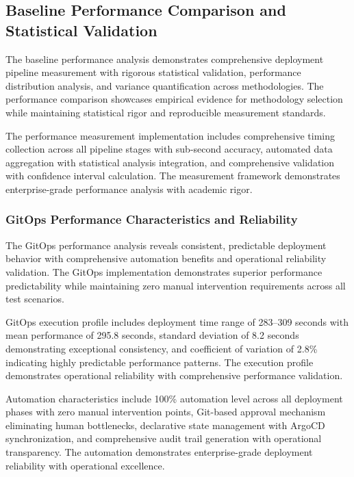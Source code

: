 \subsection{Baseline Performance Comparison and Statistical Validation}
\label{subsec:baseline_performance}

The baseline performance analysis demonstrates comprehensive deployment pipeline measurement with rigorous statistical validation, performance distribution analysis, and variance quantification across methodologies. The performance comparison showcases empirical evidence for methodology selection while maintaining statistical rigor and reproducible measurement standards.

The performance measurement implementation includes comprehensive timing collection across all pipeline stages with sub-second accuracy, automated data aggregation with statistical analysis integration, and comprehensive validation with confidence interval calculation. The measurement framework demonstrates enterprise-grade performance analysis with academic rigor.

\subsubsection{GitOps Performance Characteristics and Reliability}

The GitOps performance analysis reveals consistent, predictable deployment behavior with comprehensive automation benefits and operational reliability validation. The GitOps implementation demonstrates superior performance predictability while maintaining zero manual intervention requirements across all test scenarios.

GitOps execution profile includes deployment time range of 283--309 seconds with mean performance of 295.8 seconds, standard deviation of 8.2 seconds demonstrating exceptional consistency, and coefficient of variation of 2.8\% indicating highly predictable performance patterns. The execution profile demonstrates operational reliability with comprehensive performance validation.

Automation characteristics include 100\% automation level across all deployment phases with zero manual intervention points, Git-based approval mechanism eliminating human bottlenecks, declarative state management with ArgoCD synchronization, and comprehensive audit trail generation with operational transparency. The automation demonstrates enterprise-grade deployment reliability with operational excellence.

